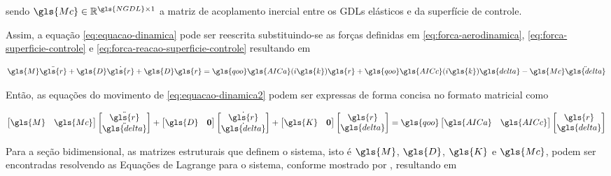 \noindent sendo $\gls{Mc} \in \mathbb{R}^{\gls{NGDL} \times 1}$ a matriz de acoplamento inercial entre os \gls{GDL}s elásticos e da superfície de controle.

Assim, a equação \eqref{eq:equacao-dinamica} pode ser reescrita substituindo-se as forças definidas em \eqref{eq:forca-aerodinamica}, \eqref{eq:forca-superficie-controle} e \eqref{eq:forca-reacao-superficie-controle} resultando em

\begin{equation} \label{eq:equacao-dinamica2}
    \gls{M}\ddot{\gls{r}} +  \gls{D}\dot{\gls{r}} + \gls{D}\gls{r} = \gls{qoo}\gls{AICa}(i\gls{k})\gls{r} +  \gls{qoo}\gls{AICc}(i\gls{k})\gls{delta} - \gls{Mc}\ddot{\gls{delta}}
\end{equation}


Então, as equações do movimento de \eqref{eq:equacao-dinamica2} podem ser expressas de forma concisa no formato matricial como

\begin{equation} \label{eq:equacao-dinamica-final}
    \begin{bmatrix}
        \gls{M} & \gls{Mc}
    \end{bmatrix}
    \begin{bmatrix}
        \ddot{\gls{r}} \\ \ddot{\gls{delta}}
    \end{bmatrix}
    +
    \begin{bmatrix}
        \gls{D} & \boldsymbol{0}
    \end{bmatrix}
    \begin{bmatrix}
        \dot{\gls{r}} \\ \dot{\gls{delta}}
    \end{bmatrix}
    +
    \begin{bmatrix}
        \gls{K} & \boldsymbol{0}
    \end{bmatrix}
    \begin{bmatrix}
        \gls{r} \\ \gls{delta}
    \end{bmatrix}
    =
    \gls{qoo}\begin{bmatrix}
        \gls{AICa} & \gls{AICc}
    \end{bmatrix}
    \begin{bmatrix}
        \gls{r} \\ \gls{delta}
    \end{bmatrix}
\end{equation}

Para a seção bidimensional, as matrizes estruturais que definem o sistema, isto é $\gls{M}$, $\gls{D}$, $\gls{K}$ e $\gls{Mc}$, podem ser encontradas resolvendo as Equações de Lagrange para o sistema, conforme mostrado por \textcite{book:Wright-Cooper}, resultando em


